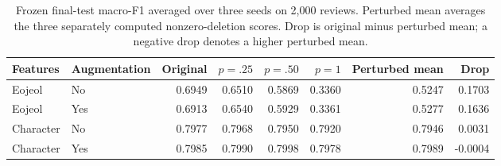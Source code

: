 \begin{table}[t]
\centering
\begin{tabular}{llrrrrrr}
\toprule
Features & Augmentation & Original & $p=.25$ & $p=.50$ & $p=1$ & Perturbed mean & Drop \\
\midrule
Eojeol & No & 0.6949 & 0.6510 & 0.5869 & 0.3360 & 0.5247 & 0.1703 \\
Eojeol & Yes & 0.6913 & 0.6540 & 0.5929 & 0.3361 & 0.5277 & 0.1636 \\
Character & No & 0.7977 & 0.7968 & 0.7950 & 0.7920 & 0.7946 & 0.0031 \\
Character & Yes & 0.7985 & 0.7990 & 0.7998 & 0.7978 & 0.7989 & -0.0004 \\
\bottomrule
\end{tabular}
\caption{Frozen final-test macro-F1 averaged over three seeds on 2,000 reviews. Perturbed mean averages the three separately computed nonzero-deletion scores. Drop is original minus perturbed mean; a negative drop denotes a higher perturbed mean.}
\label{tab:final-results}
\end{table}